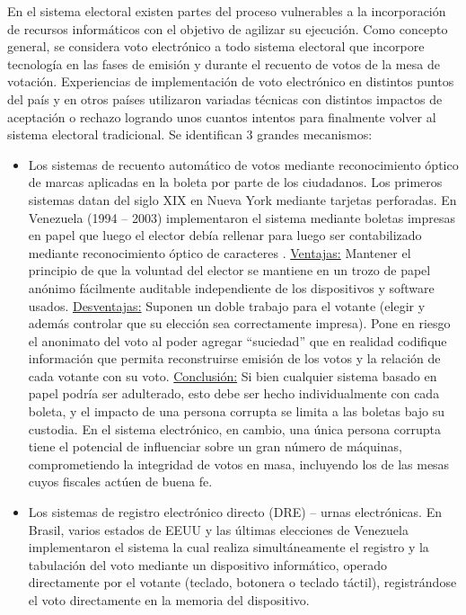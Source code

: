 En el sistema electoral existen partes del proceso vulnerables a la incorporación de recursos informáticos con el objetivo de agilizar su ejecución. Como concepto general, se considera voto electrónico a todo sistema electoral que incorpore tecnología en las fases de emisión y durante el recuento de votos de la mesa de votación. Experiencias de implementación de voto electrónico en distintos puntos del país y en otros países utilizaron variadas técnicas con distintos impactos de aceptación o rechazo logrando unos cuantos intentos para finalmente volver al sistema electoral tradicional.\newline
Se identifican 3 grandes mecanismos:
\begin{itemize}
    \item Los sistemas de recuento automático de votos mediante reconocimiento óptico de marcas aplicadas en la boleta por parte de los ciudadanos.	Los primeros sistemas datan del siglo XIX en Nueva York mediante tarjetas perforadas. En Venezuela (1994 – 2003) implementaron el sistema mediante boletas impresas en papel que luego el elector debía rellenar para luego ser contabilizado mediante reconocimiento óptico de caracteres \cite{eleccionesVenezuela}.\newline
    \underline{Ventajas:} Mantener el principio de que la voluntad del elector se mantiene en un trozo de papel anónimo fácilmente auditable independiente de los dispositivos y software usados.\newline
    \underline{Desventajas:} Suponen un doble trabajo para el votante (elegir y además controlar que su elección sea correctamente impresa). Pone en riesgo el anonimato del voto al poder agregar “suciedad” que en realidad codifique información que permita reconstruirse emisión de los votos y la relación de cada votante con su voto.\newline
    \underline{Conclusión:} Si bien cualquier sistema basado en papel podría ser adulterado, esto debe ser hecho individualmente con cada boleta, y el impacto de una persona corrupta se limita a las boletas bajo su custodia. En el sistema electrónico, en cambio, una única persona corrupta tiene el potencial de influenciar sobre un gran número de máquinas, comprometiendo la integridad de votos en masa, incluyendo los de las mesas cuyos fiscales actúen de buena fe.
    \item Los sistemas de registro electrónico directo (DRE) – urnas electrónicas. En Brasil, varios estados de EEUU y las últimas elecciones de Venezuela implementaron el sistema la cual realiza simultáneamente el registro y la tabulación del voto mediante un dispositivo informático, operado directamente por el votante (teclado, botonera o teclado táctil), registrándose el voto directamente en la memoria del dispositivo.\newline

\end{itemize}

